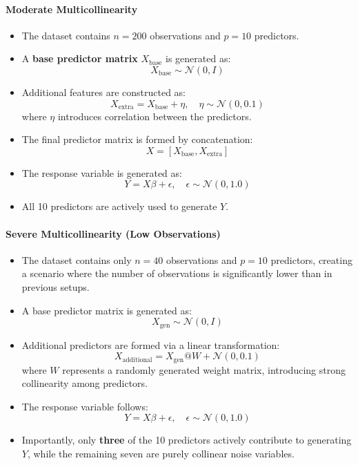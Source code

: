 \documentclass[11pt,twoside,a4paper]{article}
\begin{document}
\paragraph{Moderate Multicollinearity}
\begin{itemize}
    \item The dataset contains \( n = 200 \) observations and \( p = 10 \) predictors.
    \item A \textbf{base predictor matrix} \( X_{\text{base}} \) is generated as:
    \[ X_{\text{base}} \sim \mathcal{N}(0, I) \]
    \item Additional features are constructed as:
    \[ X_{\text{extra}} = X_{\text{base}} + \eta, \quad \eta \sim \mathcal{N}(0, 0.1) \]
    where \( \eta \) introduces correlation between the predictors.
    \item The final predictor matrix is formed by concatenation:
    \[ X = [X_{\text{base}}, X_{\text{extra}}] \]
    \item The response variable is generated as:
    \[ Y = X \beta + \epsilon, \quad \epsilon \sim \mathcal{N}(0, 1.0) \]
    \item All 10 predictors are actively used to generate \( Y \).
\end{itemize}

\paragraph{Severe Multicollinearity (Low Observations)}
\begin{itemize}
    \item The dataset contains only \( n = 40 \) observations and \( p = 10 \) predictors, creating a scenario where the number of observations is significantly lower than in previous setups.
    \item A base predictor matrix is generated as:
    \[ X_{\text{gen}} \sim \mathcal{N}(0, I) \]
    \item Additional predictors are formed via a linear transformation:
    \[ X_{\text{additional}} = X_{\text{gen}} @ W + \mathcal{N}(0, 0.1) \]
    where \( W \) represents a randomly generated weight matrix, introducing strong collinearity among predictors.
    \item The response variable follows:
    \[ Y = X \beta + \epsilon, \quad \epsilon \sim \mathcal{N}(0, 1.0) \]
    \item Importantly, only \textbf{three} of the 10 predictors actively contribute to generating \( Y \), while the remaining seven are purely collinear noise variables.
\end{itemize}
\end{document}
